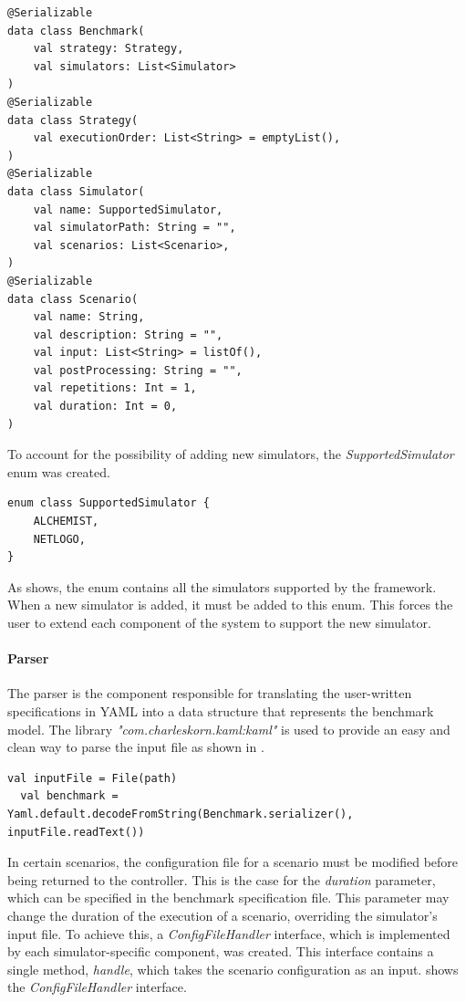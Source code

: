 \documentclass[12pt,a4paper,openright,twoside]{book}
\begin{document}
\begin{lstlisting}[style=my-kotlin, language=my-kotlin, label={lst:model-impl}, caption={Benchmark model.}]
@Serializable
data class Benchmark(
    val strategy: Strategy,
    val simulators: List<Simulator>
)
@Serializable
data class Strategy(
    val executionOrder: List<String> = emptyList(),
)
@Serializable
data class Simulator(
    val name: SupportedSimulator,
    val simulatorPath: String = "",
    val scenarios: List<Scenario>,
)
@Serializable
data class Scenario(
    val name: String,
    val description: String = "",
    val input: List<String> = listOf(),
    val postProcessing: String = "",
    val repetitions: Int = 1,
    val duration: Int = 0,
)
\end{lstlisting}

To account for the possibility of adding new simulators, the \emph{SupportedSimulator} enum was created.

\begin{lstlisting}[style=my-kotlin, language=my-kotlin, label={lst:supportedSim}, caption={SupportedSimulator enum.}]
  enum class SupportedSimulator {
    ALCHEMIST,
    NETLOGO,
}
\end{lstlisting}

As  shows, the enum contains all the simulators supported by the framework. When a new simulator is added, it must be added to this enum.
This forces the user to extend each component of the system to support the new simulator.

\paragraph*{Parser}
The parser is the component responsible for translating the user-written specifications in YAML into a data structure that represents the benchmark model.
The library \emph{"com.charleskorn.kaml:kaml"} is used to provide an easy and clean way to parse the input file as shown in .

\begin{lstlisting}[style=my-kotlin, language=my-kotlin, label={lst:yaml-parsing}, caption={Parsing of the input file.}]
  val inputFile = File(path)
  val benchmark = Yaml.default.decodeFromString(Benchmark.serializer(), inputFile.readText())
\end{lstlisting}

In certain scenarios, the configuration file for a scenario must be modified before being returned to the controller.
This is the case for the \emph{duration} parameter, which can be specified in the benchmark specification file.
This parameter may change the duration of the execution of a scenario, overriding the simulator's input file. 
To achieve this, a \emph{ConfigFileHandler} interface, which is implemented by each simulator-specific component, was created.
This interface contains a single method, \emph{handle}, which takes the scenario configuration as an input.
 shows the \emph{ConfigFileHandler} interface.
\end{document}
